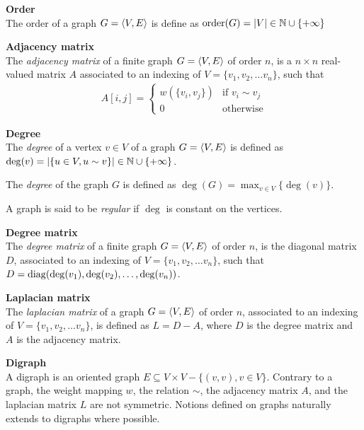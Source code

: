\begin{definition}\textbf{Order}\\
The order of a graph $G = \langle V, E \rangle$ is define as $\operatorname{order}(G) = |V| \in \mathbb{N} \cup \{+\infty\}$
\end{definition}

\begin{definition}\textbf{Adjacency matrix}\\
The \emph{adjacency matrix} of a finite graph $G = \langle V, E \rangle$ of order $n$, is a $n \times n$ real-valued matrix $A$ associated to an indexing of $V = \{v_1, v_2, \ldots v_n\}$, such that
\begin{gather*}
A[i,j] =
 \begin{cases}
   w\left(\{v_i, v_j\}\right) & \text{if } v_i \sim v_j \\
   0 & \text{otherwise}
 \end{cases}
\end{gather*}
 \end{definition}

\begin{definition}\textbf{Degree}\\
The \emph{degree} of a vertex $v \in V$ of a graph $G = \langle V, E \rangle$ is defined as $\deg(v) = |\{u \in V, u \sim v\}| \in \mathbb{N} \cup \{+\infty\}$.

The \emph{degree} of the graph $G$ is defined as $\deg(G) = \displaystyle \max_{v \in V}\{\deg(v)\}$.

A graph is said to be \emph{regular} if $\deg$ is constant on the vertices.
\end{definition}

\begin{definition}\textbf{Degree matrix}\\
The \emph{degree matrix} of a finite graph $G = \langle V, E \rangle$ of order $n$, is the diagonal matrix $D$, associated to an indexing of $V = \{v_1, v_2, \ldots v_n\}$, such that $D = \operatorname{diag}(\deg(v_1), \deg(v_2), \ldots, \deg(v_n))$.
\end{definition}

\begin{definition}\textbf{Laplacian matrix}\\
The \emph{laplacian matrix} of a graph $G = \langle V, E \rangle$ of order $n$, associated to an indexing of $V = \{v_1, v_2, \ldots v_n\}$, is defined as $L = D - A$, where $D$ is the degree matrix and $A$ is the adjacency matrix.
\end{definition}

\begin{definition}\textbf{Digraph}\\
A digraph is an oriented graph \ie $E \subseteq V \times V - \{(v,v), v \in V\}$. Contrary to a graph, the weight mapping $w$, the relation $\sim$, the adjacency matrix $A$, and the laplacian matrix $L$ are not symmetric. Notions defined on graphs naturally extends to digraphs where possible.
\end{definition}

